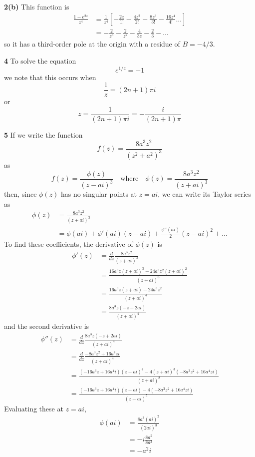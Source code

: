 \documentclass{article}
\begin{document}
\textbf{2(b)}
This function is
\begin{align*}
	\frac{1 - e^{2z}}{z^4}
	&= \frac{1}{z^4} \left[ -\frac{2z}{1!} - \frac{4z^2}{2!} - \frac{8z^3}{3!} - \frac{16z^4}{4!} \dots \right] \\
	&= -\frac{2}{z^3} - \frac{2}{z^2} - \frac{4}{3z} - \frac{2}{3} - \dots
\end{align*}
so it has a third-order pole at the origin with a residue of $B = -4/3$.

\textbf{4}
To solve the equation
\[
	e^{1/z} = -1
\]
we note that this occurs when
\[
	\frac{1}{z} = (2n + 1) \pi i
\]
or
\[
	z = \frac{1}{(2n + 1)\pi i} = -\frac{i}{(2n + 1)\pi}
\]

\textbf{5}
If we write the function
\[
	f(z) = \frac{8a^3z^2}{(z^2 + a^2)^3}
\]
as
\[
	f(z) = \frac{\phi(z)}{(z - ai)^3} \quad \text{where} \quad
	\phi(z) = \frac{8a^3z^2}{(z + ai)^3}
\]
then, since $\phi(z)$ has no singular points at $z = ai$, we can write its Taylor series as
\begin{align*}
	\phi(z)
	&= \frac{8a^3z^2}{(z + ai)^3} \\
	&= \phi(ai) + \phi'(ai) (z - ai) + \frac{\phi''(ai)}{2} (z - ai)^2 + \dots
\end{align*}
To find these coefficients, the derivative of $\phi(z)$ is
\begin{align*}
	\phi'(z)
	&= \frac{d}{dz} \frac{8a^3z^2}{(z + ai)^3} \\
	&= \frac{16a^3z (z + ai)^3 - 24a^3z^2(z + ai)^2}{(z + ai)^6} \\
	&= \frac{16a^3z (z + ai) - 24a^3z^2}{(z + ai)^4} \\
	&= \frac{8a^3z (-z + 2ai)}{(z + ai)^4}
\end{align*}
and the second derivative is
\begin{align*}
	\phi''(z)
	&= \frac{d}{dz} \frac{8a^3z (-z + 2ai)}{(z + ai)^4} \\
	&= \frac{d}{dz} \frac{-8a^3z^2 + 16a^4z i}{(z + ai)^4} \\
	&= \frac{(-16a^3z + 16a^4 i)(z + ai)^4 - 4(z + ai)^3(-8a^3z^2 + 16a^4z i)}{(z + ai)^8} \\
	&= \frac{(-16a^3z + 16a^4 i)(z + ai) - 4(-8a^3z^2 + 16a^4z i)}{(z + ai)^5}
\end{align*}
Evaluating these at $z = ai$,
\begin{align*}
	\phi(ai) 
	&= \frac{8a^3(ai)^2}{(2ai)^3} \\
	&= - i \frac{8a^5}{8a^3} \\
	&= - a^2i
\end{align*}
\end{document}
